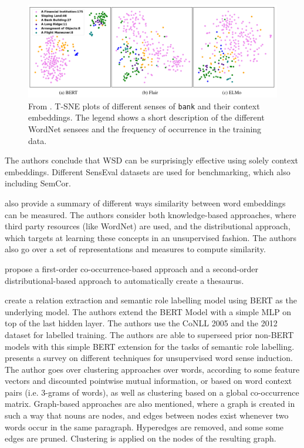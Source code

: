\documentclass[a4paper,12pt,twoside,openright]{report}
\begin{document}
\begin{figure}[h]
	\center
  \includegraphics[width=0.6\linewidth]{./assets/relatedwork/wsd_bert.png}
  \caption{From \cite{wiedmann19}. T-SNE plots of different senses of \texttt{bank} and their context embeddings. The legend shows a short description of the different WordNet sensees and the frequency of occurrence in the training data.
  }
  \label{fig:bert_wsd}
\end{figure}

The authors conclude that WSD can be surprisingly effective using solely context embeddings.
Different SensEval datasets are used for benchmarking, which also including SemCor.

\cite{navigli19} also provide a summary of different ways similarity between word embeddings can be measured.
The authors consider both knowledge-based approaches, where third party resources (like WordNet) are used, and the distributional approach, which targets at learning these concepts in an unsupervised fashion.
The authors also go over a set of representations and measures to compute similarity.

\cite{liebeskind19} propose a first-order co-occurrence-based approach and a second-order distributional-based approach to automatically create a thesaurus.

\cite{shi19} create a relation extraction and semantic role labelling model using BERT as the underlying model.
The authors extend the BERT Model with a simple MLP on top of the last hidden layer. 
The authors use the CoNLL 2005 \cite{carreras04} and the 2012  dataset \cite{pradhan13} for labelled training.
The authors are able to superseed prior non-BERT models with this simple BERT extension for the tasks of semantic role labelling. \\

\cite{denkowski09} presents a survey on different techniques for unsupervised word sense induction.
The author goes over clustering approaches over words, according to some feature vectors and discounted pointwise mutual information, or based on word context pairs (i.e. 3-grams of words), as well as clustering based on a global co-occurrence matrix.
Graph-based approaches are also mentioned, where a graph is created in such a way that nouns are nodes, and edges between nodes exist whenever two words occur in the same paragraph.
Hyperedges are removed, and some some edges are pruned.
Clustering is applied on the nodes of the resulting graph.
\end{document}
